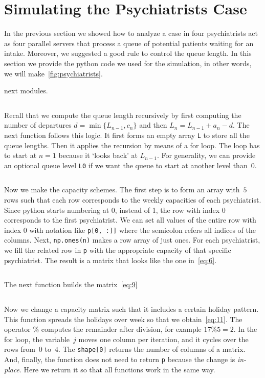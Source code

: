 \documentclass[queueing-book.tex]{subfiles}
\begin{document}
\section{Simulating the Psychiatrists Case}
\label{sec:simul-psych-case}

In the previous section we showed how to analyze a case in four psychiatrists act as four parallel servers that process a queue of potential patients waiting for an intake.
Moreover, we suggested a good rule to control the queue length.
In this section we provide the python code we used for the simulation, in other words, we will make~\cref{fig:psychiatrists}.


 next modules.
\inputminted[firstline=2, lastline=4]{python}{../code/psychiatrists.py} %

Recall that we compute the queue length recursively by first computing the number of departures $d = \min\{L_{n-1}, c_{n}\}$ and then $L_{n} = L_{n-1}+a_n-d$.
The next function follows this logic.
It  first forms an empty array \texttt{L} to store all the queue lengths.
Then it applies the recursion by means of a for loop. The loop has to start at $n=1$ because it `looks back' at $L_{n-1}$.
For generality, we can provide an optional queue level \texttt{L0} if we want the queue to start at another level than~$0$.
\inputminted[firstline=27, lastline=34]{python}{../code/psychiatrists.py} %


Now we make the capacity schemes.
The first step is to form an array with~$5$ rows such that each row corresponds to the weekly capacities of each psychiatrist.
Since python starts numbering at 0, instead of 1, the row with index 0 corresponds to the first psychiatrist.
We can set all values of the entire row with index 0 with notation like \texttt{p[0, :]]} where the semicolon refers all indices of the columns. Next, \texttt{np.ones(n)} makes a row array of just ones. For each psychiatrist, we fill the related row in \texttt{p} with the appropriate capacity of that specific psychiatrist. The result is a matrix that looks like the one in~\cref{eq:6}.
\inputminted[firstline=57, lastline=64]{python}{../code/psychiatrists.py} %

The next function builds the matrix~\cref{eq:9}
\inputminted[firstline=71, lastline=78]{python}{../code/psychiatrists.py} %

Now we change a capacity matrix such that it includes a certain holiday pattern.
This function spreads the holidays over week so that we obtain~\cref{eq:11}.
The operator $\%$ computes the remainder after division, for example $ 17 \% 5 = 2$.
In the for loop, the variable~$j$ moves one column per iteration, and it cycles over the rows from~$0$ to~$4$.
The \texttt{shape[0]} returns the number of columns of a matrix.
And, finally, the function does not need to return \texttt{p} because the change is \emph{in-place}. Here we return it so that all functions work in the same way.
\inputminted[firstline=85, lastline=89]{python}{../code/psychiatrists.py} %
\end{document}
